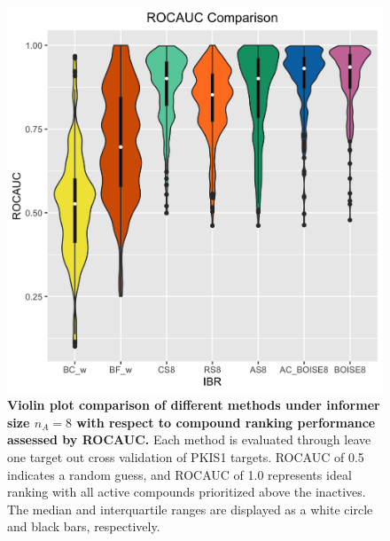 \documentclass[12pt]{article}
\begin{document}
\begin{figure}[!ht]
\caption{\label{fig:auc} 
{\bf Violin plot comparison of different methods under informer size $n_A =8$ with respect to compound ranking performance assessed by ROCAUC.} Each method is evaluated through leave one target out cross validation of PKIS1 targets. ROCAUC of 0.5 indicates a random guess, and ROCAUC of 1.0 represents ideal ranking with all active compounds prioritized above the inactives. The median and interquartile ranges are displayed as a white circle and black bars, respectively.} 
\centering
\includegraphics[width=5.0in]{pkis1_8_ROCAUC_AC.png}
\end{figure}
\end{document}
